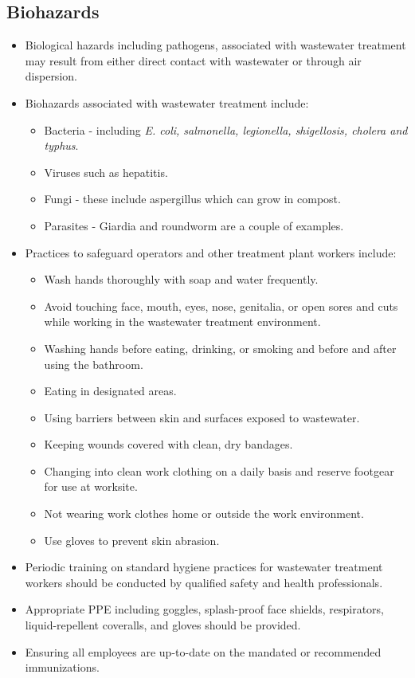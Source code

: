 \subsection{Biohazards}
\begin{itemize}
\item Biological hazards including pathogens, associated with wastewater treatment may result from either direct contact with wastewater or through air dispersion.
\item Biohazards associated with wastewater treatment include:
\begin{itemize}
\item Bacteria - including \textit{E. coli, salmonella, legionella, shigellosis, cholera and typhus}.
\item Viruses such as hepatitis.
\item Fungi - these include aspergillus which can grow in compost.
\item Parasites - Giardia and roundworm are a couple of examples.
\end{itemize}
\item Practices to safeguard operators and other treatment plant workers include:
\begin{itemize}
\item Wash hands thoroughly with soap and water frequently.
\item Avoid touching face, mouth, eyes, nose, genitalia, or open sores and cuts while
working in the wastewater treatment environment.
\item Washing hands before eating, drinking, or smoking and before and after using the
bathroom.
\item Eating in designated areas.
\item Using barriers between skin and surfaces exposed to wastewater.
\item Keeping wounds covered with clean, dry bandages.
\item Changing into clean work clothing on a daily basis and reserve footgear for use at
worksite.
\item Not wearing work clothes home or outside the work environment.
\item Use gloves to prevent skin abrasion.
\end{itemize}
\item Periodic training on standard hygiene practices for wastewater treatment workers should be conducted by qualified safety and health professionals.
\item Appropriate PPE  including goggles, splash-proof face shields, respirators, liquid-repellent coveralls, and gloves should be provided.
\item Ensuring all employees are up-to-date on the mandated or recommended immunizations.
\end{itemize}

